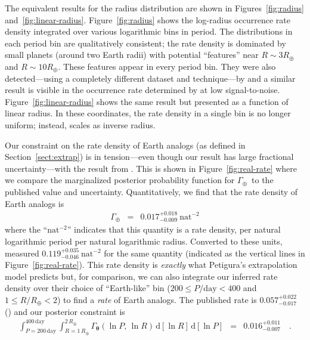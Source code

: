 \documentclass[12pt,preprint]{aastex}
\newcommand{\figref}[1]{\ref{fig:#1}}
\newcommand{\Fig}[1]{Figure~\figref{#1}}
\newcommand{\fig}[1]{\Fig{#1}}
\newcommand{\eqlabel}[1]{\label{eq:#1}}
\newcommand{\Sect}[1]{Section~\ref{sect:#1}}
\newcommand{\sect}[1]{\Sect{#1}}
\newcommand{\dd}{\ensuremath{\,\mathrm{d}}}
\newcommand{\bvec}[1]{\ensuremath{\boldsymbol{#1}}}
\newcommand{\densityunit}{{\ensuremath{\mathrm{nat}^{-2}}}}
\newcommand{\rate}{\ensuremath{\Gamma}}
\newcommand{\ratepar}{{\ensuremath{\theta}}}
\newcommand{\ratepars}{{\ensuremath{\bvec{\ratepar}}}}
\newcommand{\radius}{\ensuremath{R}}
\newcommand{\period}{\ensuremath{P}}
\newcommand{\gammaearth}{{\ensuremath{\rate_\oplus}}}
\begin{document}
The equivalent results for the radius distribution are shown in
Figures~\figref{radius} and~\figref{linear-radius}.
\Fig{radius} shows the log-radius occurrence rate density integrated over
various logarithmic bins in period.
The distributions in each period bin are qualitatively consistent; the
rate density is dominated by small planets (around two Earth radii) with
potential ``features'' near $\radius\sim3\radius_\oplus$ and $\radius\sim
10\radius_\oplus$.
These features appear in every period bin.
They were also detected---using a completely different dataset and
technique---by \citet{dong} and a similar result is visible in the occurrence
rate determined by \citet[][their Figure 7]{fressin-fp} at low
signal-to-noise.
\Fig{linear-radius} shows the same result but presented as a function of
linear radius.
In these coordinates, the rate density in a single bin is no longer
uniform; instead, scales as inverse radius.

Our constraint on the rate density of Earth analogs (as defined in
\sect{extrap}) is in tension---even though our result has large fractional
uncertainty---with the result from \citet{petigura}.
This is shown in \fig{real-rate} where we compare the marginalized posterior
probability function for \gammaearth\ to the published value and uncertainty.
Quantitatively, we find that the rate density of Earth analogs is
\begin{eqnarray}\eqlabel{ge-result}
\gammaearth &=& 0.017^{+0.018}_{-0.009}~\densityunit
\end{eqnarray}
where the ``\densityunit'' indicates that this quantity is a rate density, per
natural logarithmic period per natural logarithmic radius.
Converted to these units, \citet{petigura} measured
$0.119_{-0.046}^{+0.035}~\densityunit$ for the same quantity (indicated as the
vertical lines in \fig{real-rate}).
This rate density is \emph{exactly} what Petigura's extrapolation model
predicts but, for comparison, we can also integrate our inferred rate density
over their choice of ``Earth-like'' bin ($200 \le \period/\mathrm{day} < 400$
and $1 \le \radius/\radius_\oplus < 2$) to find a \emph{rate} of
Earth analogs.
The published rate is $0.057_{-0.017}^{+0.022}$ (\citealt{petigura}) and our
posterior constraint is
\begin{eqnarray}
\int_{\period=200\,\mathrm{day}}^{400\,\mathrm{day}}
\int_{\radius=1\,\radius_\oplus}^{2\,\radius_\oplus}
\rate_\ratepars (\ln\period,\,\ln\radius)
\dd[\ln\radius]
\dd[\ln\period]
&=&
0.016_{-0.007}^{+0.011}
\quad.
\end{eqnarray}
\end{document}
